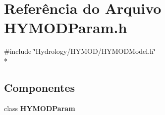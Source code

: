 \section{Referência do Arquivo H\+Y\+M\+O\+D\+Param.\+h}
\label{_h_y_m_o_d_param_8h}
{\ttfamily \#include \char`\"{}Hydrology/\+H\+Y\+M\+O\+D/\+H\+Y\+M\+O\+D\+Model.\+h\char`\"{}}\\*
\subsection*{Componentes}
\begin{DoxyCompactItemize}
\item 
class {\bf H\+Y\+M\+O\+D\+Param}
\end{DoxyCompactItemize}
